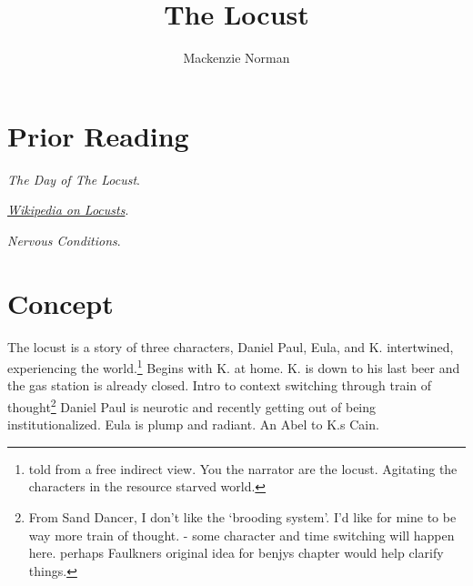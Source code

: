 \documentclass{article}
\title{The Locust}
\author{Mackenzie Norman}
\begin{document}
\maketitle
\textit{}
\section*{Prior Reading}
\begin{list} {}
\item\textit{The Day of The Locust}. 

\item\textit{\href{https://en.wikipedia.org/wiki/Locust}{Wikipedia on Locusts}}. 
\item\textit{Nervous Conditions}. 
\end{list}
\section*{Concept}
The locust is a story of three characters, Daniel Paul, Eula, and K. intertwined, experiencing the world.\footnote{told from a free indirect view. You the narrator are the locust. Agitating the characters in the resource starved world.} Begins with K. at home. K. is down to his last beer and the gas station is already closed. Intro to context switching through train of thought\footnote{From Sand Dancer, I don't like the `brooding system'. I'd like for mine to be way more train of thought. - some character and time switching will happen here. perhaps Faulkners original idea for benjys chapter would help clarify things.} Daniel Paul is neurotic and recently getting out of being institutionalized. Eula is plump and radiant. An Abel to K.s Cain. 
\end{document}
